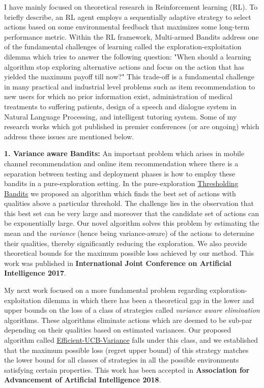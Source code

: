 \documentclass{article}
\begin{document}
I have mainly focused on theoretical research in Reinforcement learning (RL). To briefly describe, an RL agent employs a sequentially adaptive strategy to select actions based on some environmental feedback that maximizes some long-term performance metric. Within the RL framework, Multi-armed Bandits address one of the fundamental challenges of learning called the exploration-exploitation dilemma which tries to answer the following question: "When should a learning algorithm stop exploring alternative actions and focus on the action that has yielded the maximum payoff till now?" This trade-off is a fundamental challenge in many practical and industrial level problems such as item recommendation to new users for which no prior information exist, administration of medical treatments to suffering patients, design of a speech and dialogue system in Natural Language Processing, and intelligent tutoring system. Some of my research works which got published in premier conferences (or are ongoing) which address these issues are mentioned below.


\textbf{1. Variance aware Bandits:} An important problem which arises in mobile channel recommendation and online item recommendation where there is a separation between testing and deployment phases is how to employ these bandits in a pure-exploration setting. In the pure-exploration \href{https://www.ijcai.org/proceedings/2017/0350.pdf}{\underline{\color{blue}Thresholding Bandits}} \citep{mukherjee2016} we proposed an algorithm which finds the best set of actions with qualities above a particular threshold. The challenge lies in the observation that this best set can be very large and moreover that the candidate set of actions can be exponentially large. Our novel algorithm solves this problem by estimating the mean and the \textit{variance} (hence being variance-aware) of the actions to determine their qualities, thereby significantly reducing the exploration. We also provide theoretical bounds for the maximum possible loss achieved by our
method. This work was published in \textbf{International Joint Conference on Artificial Intelligence 2017}.


My next work focused on a more fundamental problem regarding exploration-exploitation dilemma in which there has been a theoretical gap in the lower and upper bounds on the loss of a class of strategies called \textit{variance aware elimination} algorithms. These algorithms eliminate actions which are deemed to be sub-par depending on their qualities based on estimated variances. Our proposed algorithm called \href{https://www.aaai.org/ocs/index.php/AAAI/AAAI18/paper/view/16111}{\underline{\color{blue}Efficient-UCB-Variance}} \citep{mukherjee2018} falls under this class, and we established that the maximum possible loss (regret upper bound) of this strategy matches the lower bound for all classes of strategies in all the possible environments satisfying certain properties. This work has been accepted in \textbf{Association for Advancement of Artificial Intelligence 2018}.
\end{document}
